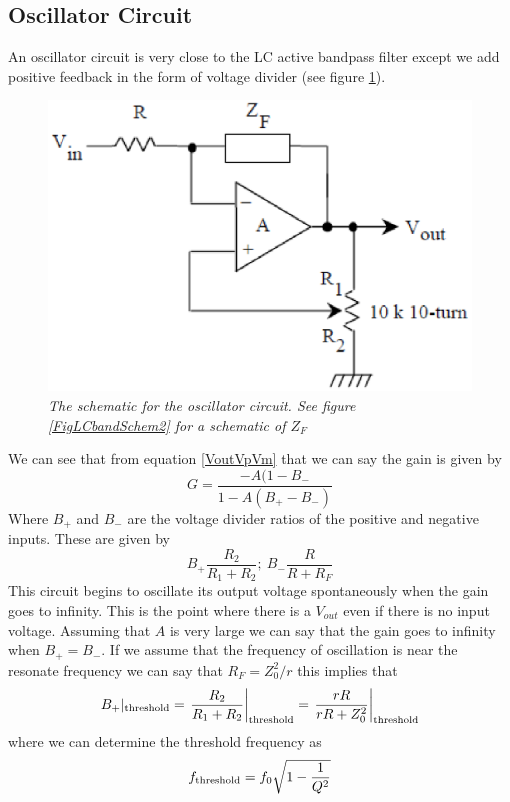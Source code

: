 \documentclass[11pt]{article}
\numberwithin{equation}{section}
\numberwithin{figure}{section}
\numberwithin{table}{section}
\begin{document}
\subsection{Oscillator Circuit}
An oscillator circuit is very close to the LC active bandpass filter except we add positive feedback in the form of voltage divider (see figure \ref{FigOscSchem}).
\begin{figure}[h]
\centering
\includegraphics[scale=0.60]{FigOscSchem.eps}
\caption{\textit{The schematic for the oscillator circuit. See figure \ref{FigLCbandSchem2} for a schematic of $Z_F$}}
\label{FigOscSchem}
\end{figure}
We can see that from equation \ref{VoutVpVm} that we can say the gain is given by
$$G = \frac{-A(1-B_-}{1-A(B_+-B_-)}$$
Where $B_+$ and $B_-$ are the voltage divider ratios of the positive and negative inputs. These are given by
$$B_+\frac{R_2}{R_1+R_2};\ B_-\frac{R}{R+R_F}$$ 
This circuit begins to oscillate its output voltage spontaneously when the gain goes to infinity. This is the point where there is a $V_{out}$ even if there is no input voltage. Assuming that $A$ is very large we can say that the gain goes to infinity when $B_+=B_-$. If we assume that the frequency of oscillation is near the resonate frequency we can say that $R_F=Z_0^2/r$ this implies that
$$B_+|_{\textnormal{threshold}} = \left.\frac{R_2}{R_1+R_2}\right|_{\textnormal{threshold}} = \left.\frac{rR}{rR+Z_0^2}\right|_{\textnormal{threshold}}$$
where we can determine the threshold frequency as
\begin{equation}
f_{\textnormal{threshold}} = f_0\sqrt{1-\frac{1}{Q^2}}
\label{ThresFreq}
\end{equation}
\end{document}
